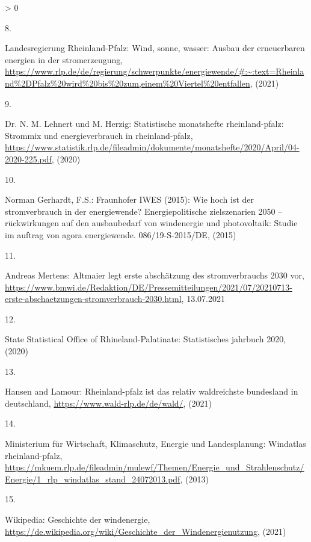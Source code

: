 \documentclass[a4paper,11pt]{article}
\newlength{\cslhangindent}
\newlength{\csllabelwidth}
\newenvironment{CSLReferences}[3] %
 {%
  \setlength{\parindent}{0pt}
  \ifodd #1 \everypar{\setlength{\hangindent}{\cslhangindent}}\ignorespaces\fi
  \ifnum #2 > 0
  \setlength{\parskip}{#2\baselineskip}
  \fi
 }%
 {}
\newcommand{\CSLLeftMargin}[1]{\parbox[t]{\maxof{\widthof{#1}}{\csllabelwidth}}{#1}}
\newcommand{\CSLRightInline}[1]{\parbox[t]{\linewidth}{#1}}
\begin{document}
\begin{CSLReferences}{0}{0}
\leavevmode\hypertarget{ref-LandesregierungRheinlandPfalz.2021}{}%
\CSLLeftMargin{8. }
\CSLRightInline{Landesregierung Rheinland-Pfalz: Wind, sonne, wasser: Ausbau der erneuerbaren energien in der stromerzeugung, \url{https://www.rlp.de/de/regierung/schwerpunkte/energiewende/\#:~:text=Rheinland\%2DPfalz\%20wird\%20bis\%20zum,einem\%20Viertel\%20entfallen}, (2021)}

\leavevmode\hypertarget{ref-Lehnert.2020}{}%
\CSLLeftMargin{9. }
\CSLRightInline{Dr. N. M. Lehnert und M. Herzig: Statistische monatshefte rheinland-pfalz: Strommix und energieverbrauch in rheinland-pfalz, \url{https://www.statistik.rlp.de/fileadmin/dokumente/monatshefte/2020/April/04-2020-225.pdf}, (2020)}

\leavevmode\hypertarget{ref-NormanGerhardt.2015}{}%
\CSLLeftMargin{10. }
\CSLRightInline{Norman Gerhardt, F.S.: Fraunhofer IWES (2015): Wie hoch ist der stromverbrauch in der energiewende? Energiepolitische zielszenarien 2050 -- r{ü}ckwirkungen auf den ausbaubedarf von windenergie und photovoltaik: Studie im auftrag von agora energiewende. 086/19-S-2015/DE, (2015)}

\leavevmode\hypertarget{ref-AndreasMertens.13.07.2021}{}%
\CSLLeftMargin{11. }
\CSLRightInline{Andreas Mertens: Altmaier legt erste absch{ä}tzung des stromverbrauchs 2030 vor, \url{https://www.bmwi.de/Redaktion/DE/Pressemitteilungen/2021/07/20210713-erste-abschaetzungen-stromverbrauch-2030.html}, 13.07.2021}

\leavevmode\hypertarget{ref-StateStatisticalOfficeofRhinelandPalatinate.2020}{}%
\CSLLeftMargin{12. }
\CSLRightInline{State Statistical Office of Rhineland-Palatinate: Statistisches jahrbuch 2020, (2020)}

\leavevmode\hypertarget{ref-HansenandLamour.2021}{}%
\CSLLeftMargin{13. }
\CSLRightInline{Hansen and Lamour: Rheinland-pfalz ist das relativ waldreichste bundesland in deutschland, \url{https://www.wald-rlp.de/de/wald/}, (2021)}

\leavevmode\hypertarget{ref-MinisteriumfurWirtschaftKlimaschutzEnergieundLandesplanung.2013}{}%
\CSLLeftMargin{14. }
\CSLRightInline{Ministerium für Wirtschaft, Klimaschutz, Energie und Landesplanung: Windatlas rheinland-pfalz, \url{https://mkuem.rlp.de/fileadmin/mulewf/Themen/Energie_und_Strahlenschutz/Energie/1_rlp_windatlas_stand_24072013.pdf}, (2013)}

\leavevmode\hypertarget{ref-Wikipedia.2021}{}%
\CSLLeftMargin{15. }
\CSLRightInline{Wikipedia: Geschichte der windenergie, \url{https://de.wikipedia.org/wiki/Geschichte_der_Windenergienutzung}, (2021)}


\end{CSLReferences}
\end{document}
